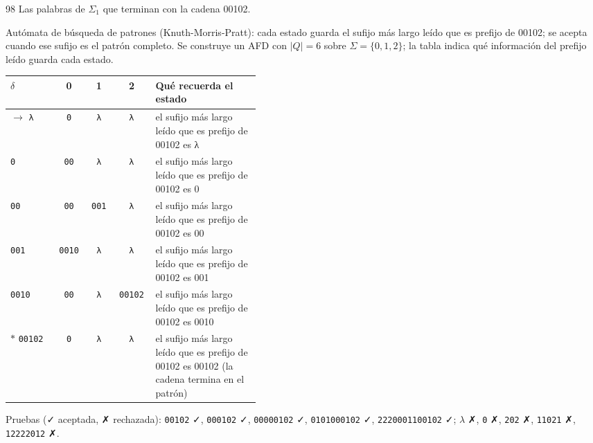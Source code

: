 \documentclass[11pt]{article}
\begin{document}
\begin{ejercicio}{98}{}
Las palabras de $\Sigma_1$ que terminan con la cadena 00102.
\end{ejercicio}
\proc Autómata de búsqueda de patrones (Knuth-Morris-Pratt): cada estado guarda el sufijo más largo leído que es prefijo de 00102; se acepta cuando ese sufijo es el patrón completo. Se construye un AFD con $|Q| = 6$ sobre $\Sigma = \{0, 1, 2\}$; la tabla indica qué información del prefijo leído guarda cada estado.
\begin{center}\small\begin{tabular}{lcccp{0.42\linewidth}}\toprule
$\delta$ & 0 & 1 & 2 & Qué recuerda el estado \\\midrule
$\to$ \texttt{λ} & \texttt{0} & \texttt{λ} & \texttt{λ} & el sufijo más largo leído que es prefijo de 00102 es λ \\
 \texttt{0} & \texttt{00} & \texttt{λ} & \texttt{λ} & el sufijo más largo leído que es prefijo de 00102 es 0 \\
 \texttt{00} & \texttt{00} & \texttt{001} & \texttt{λ} & el sufijo más largo leído que es prefijo de 00102 es 00 \\
 \texttt{001} & \texttt{0010} & \texttt{λ} & \texttt{λ} & el sufijo más largo leído que es prefijo de 00102 es 001 \\
 \texttt{0010} & \texttt{00} & \texttt{λ} & \texttt{00102} & el sufijo más largo leído que es prefijo de 00102 es 0010 \\
$*$ \texttt{00102} & \texttt{0} & \texttt{λ} & \texttt{λ} & el sufijo más largo leído que es prefijo de 00102 es 00102 (la cadena termina en el patrón) \\
\bottomrule\end{tabular}\end{center}
Pruebas (✓ aceptada, ✗ rechazada): \texttt{00102} ✓, \texttt{000102} ✓, \texttt{00000102} ✓, \texttt{0101000102} ✓, \texttt{2220001100102} ✓; $\lambda$ ✗, \texttt{0} ✗, \texttt{202} ✗, \texttt{11021} ✗, \texttt{12222012} ✗.
\end{document}
